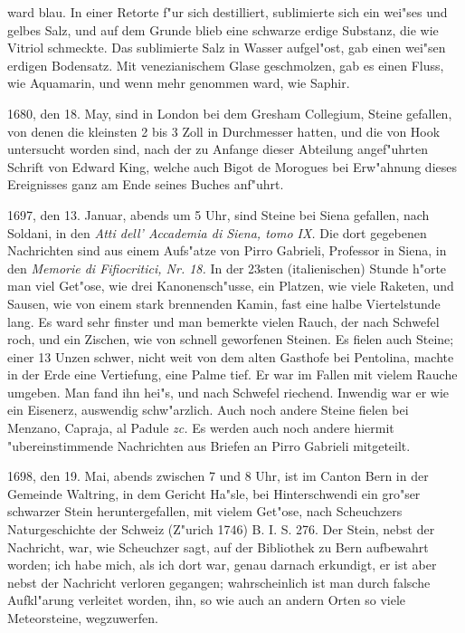 \documentclass[a4paper, 11pt, oneside, polutonikogreek, german]{article}
\begin{document}
ward blau. In einer Retorte f"ur sich destilliert, sublimierte sich ein wei"ses und gelbes Salz, und auf dem Grunde blieb eine schwarze erdige Substanz, die wie Vitriol schmeckte. Das sublimierte Salz in Wasser aufgel"ost, gab einen wei"sen erdigen Bodensatz. Mit venezianischem Glase geschmolzen, gab es einen Fluss, wie Aquamarin, und wenn mehr genommen ward, wie Saphir.

1680, den 18. May, sind in London bei dem Gresham Collegium, Steine gefallen, von denen die kleinsten 2 bis 3 Zoll in Durchmesser hatten, und die von Hook untersucht worden sind, nach der zu Anfange dieser Abteilung angef"uhrten Schrift von Edward King, welche auch Bigot de Morogues bei Erw"ahnung dieses Ereignisses ganz am Ende seines Buches anf"uhrt.

1697, den 13. Januar, abends um 5 Uhr, sind Steine bei Siena gefallen, nach Soldani, in den \emph{Atti dell' Accademia di Siena, tomo IX.} Die dort gegebenen Nachrichten sind aus einem Aufs"atze von Pirro Gabrieli, Professor in Siena, in den \emph{Memorie di Fifiocritici, Nr. 18.} In der 23sten (italienischen) Stunde h"orte man viel Get"ose, wie drei Kanonensch"usse, ein Platzen, wie viele Raketen, und Sausen, wie von einem stark brennenden Kamin, fast eine halbe Viertelstunde lang. Es ward sehr finster und man bemerkte vielen Rauch, der nach Schwefel roch, und ein Zischen, wie von schnell geworfenen Steinen. Es fielen auch Steine; einer 13 Unzen schwer, nicht weit von dem alten Gasthofe bei Pentolina, machte in der Erde eine Vertiefung, eine Palme tief. Er war im Fallen mit vielem Rauche umgeben. Man fand ihn hei"s, und nach Schwefel riechend. Inwendig war er wie ein Eisenerz, auswendig schw"arzlich. Auch noch andere Steine fielen bei Menzano, Capraja, al Padule \emph{zc.} Es werden auch noch andere hiermit "ubereinstimmende Nachrichten aus Briefen an Pirro Gabrieli mitgeteilt.

1698, den 19. Mai, abends zwischen 7 und 8 Uhr, ist im Canton Bern in der Gemeinde Waltring, in dem Gericht Ha"sle, bei Hinterschwendi ein gro"ser schwarzer Stein heruntergefallen, mit vielem Get"ose, nach Scheuchzers Naturgeschichte der Schweiz (Z"urich 1746) B. I. S. 276. Der Stein, nebst der Nachricht, war, wie Scheuchzer sagt, auf der Bibliothek zu Bern aufbewahrt worden; ich habe mich, als ich dort war, genau darnach erkundigt, er ist aber nebst der Nachricht verloren gegangen; wahrscheinlich ist man durch falsche Aufkl"arung verleitet worden, ihn, so wie auch an andern Orten so viele Meteorsteine, wegzuwerfen.
\end{document}
